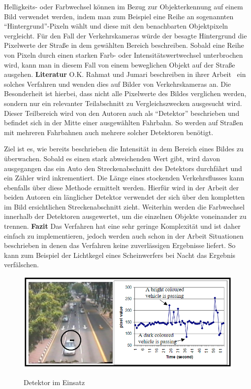 Helligkeits- oder Farbwechsel können im Bezug zur Objekterkennung auf einem Bild verwendet werden, indem man zum Beispiel eine Reihe an sogenannten "`Hintergrund"'-Pixeln wählt und diese mit den benachbarten Objektpixeln vergleicht.
Für den Fall der Verkehrskameras würde der besagte Hintergrund die Pixelwerte der Straße in dem gewählten Bereich beschreiben.
Sobald eine Reihe von Pixeln durch einen starken Farb- oder Intensitätswertwechsel unterbrochen wird, kann man in diesem Fall von einem beweglichen Objekt auf der Straße ausgehen.\newline\newline
\textbf{Literatur}\newline
O.K. Rahmat und Jumari beschreiben in ihrer Arbeit~\cite{bin2001vehicle} ein solches Verfahren und wenden dies auf Bilder von Verkehrskameras an. 
Die Besonderheit ist hierbei, dass nicht alle Pixelwerte des Bildes verglichen werden, sondern nur ein relevanter Teilabschnitt zu Vergleichszwecken ausgesucht wird. 
Dieser Teilbereich wird von den Autoren auch als "`Detektor"' beschrieben und befindet sich in der Mitte einer ausgewählten Fahrbahn. 
So werden auf Straßen mit mehreren Fahrbahnen auch mehrere solcher Detektoren benötigt.

Ziel ist es, wie bereits beschrieben die Intensität in dem Bereich eines Bildes zu überwachen. 
Sobald es einen stark abweichenden Wert gibt, wird davon ausgegangen das ein Auto den Streckenabschnitt des Detektors durchfährt und ein Zähler wird inkrementiert.
Die Länge eines stockenden Verkehrsflusses kann ebenfalls über diese Methode ermittelt werden. 
Hierfür wird in der Arbeit der beiden Autoren ein länglicher Detektor verwendet der sich über den kompletten im Bild ersichtlichen Streckenabschnitt zieht.
Weiterhin werden die Farbwechsel innerhalb der Detektoren ausgewertet, um die einzelnen Objekte voneinander zu trennen.
\newline\newline
\textbf{Fazit}\newline
Das Verfahren hat eine sehr geringe Komplexität und ist daher einfach zu implementieren, jedoch werden auch schon in der Arbeit Situationen beschrieben in denen das Verfahren keine zuverlässigen Ergebnisse liefert. 
So kann zum Beispiel der Lichtkegel eines Scheinwerfers bei Nacht das Ergebnis verfälschen.
\begin{figure}[ht]
   \centering
     \includegraphics[width=15cm]{Bilder/pixelanalysis} \\
 \caption{Detektor im Einsatz}
 \label{fig:Pixelanalysis}
\end{figure}
\newpage
